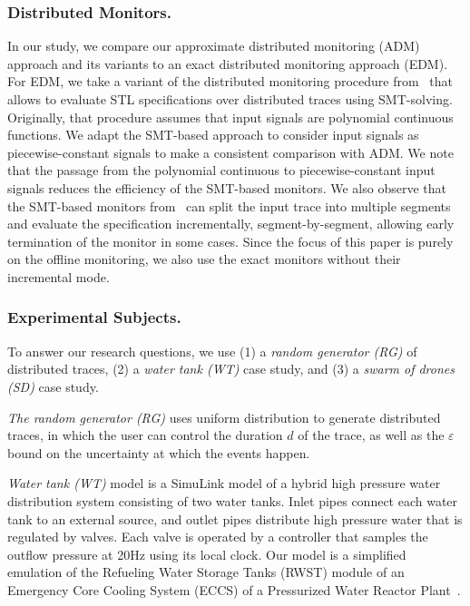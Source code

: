 \subsubsection{Distributed Monitors.}
In our study, we compare our approximate distributed monitoring (ADM) approach and its variants to an exact distributed monitoring approach (EDM).
For EDM, we take a variant of the distributed monitoring procedure from~\cite{MomtazAB23} that allows to evaluate STL specifications over distributed traces using SMT-solving.
Originally, that procedure assumes that input signals are polynomial continuous functions.
We adapt the SMT-based approach to consider input signals as piecewise-constant signals to make a consistent comparison with ADM.
We note that the passage from the polynomial continuous to piecewise-constant input signals reduces the efficiency of the SMT-based monitors.
We also observe that the SMT-based monitors from~\cite{MomtazAB23} can split the input trace into multiple segments and evaluate the specification incrementally, segment-by-segment, allowing early termination of the monitor in some cases.
Since the focus of this paper is purely on the offline monitoring, we also use the exact monitors without their incremental mode.

\vspace{-0.4em}
\subsubsection{Experimental Subjects.}
To answer our research questions, we use (1) a \emph{random generator (RG)} of distributed traces, (2) a \emph{water tank (WT)} case study, and (3) a \emph{swarm of drones (SD)} case study.  

\noindent \emph{The random generator (RG)} uses uniform distribution to generate distributed traces, in which the user can control the duration $d$ of the trace, as well as the $\varepsilon$ bound on the uncertainty at which the events happen.

\noindent \emph{Water tank (WT)} model is a SimuLink model of a hybrid high pressure water distribution system consisting of two water tanks. Inlet pipes connect each water tank to an external source, and outlet pipes distribute high pressure water that is regulated by valves.
Each valve is operated by a controller that samples the outflow pressure at 20Hz using its local clock. Our model is a simplified emulation of the Refueling Water Storage Tanks (RWST) module of an Emergency Core Cooling System (ECCS) of a Pressurized Water Reactor Plant~\cite{USNRCPWR}.

